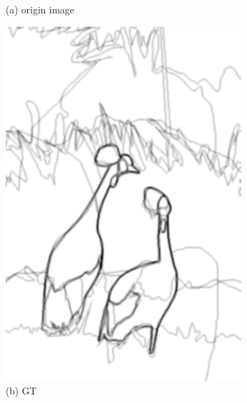 \documentclass[CJK,aspectratio=169]{beamer}  %
\begin{document}
\begin{frame}
\begin{figure}
\begin{minipage}{0.11\columnwidth}
				\caption*{\tiny (a) origin image}
				\label{fig: origin image}
			\end{minipage}
			\begin{minipage}{0.11\columnwidth}
				\includegraphics[width=\linewidth]{picture/LLIE/RCF/GT}
				\caption*{\tiny (b) GT}
				\label{fig: RCF_GT}
			\end{minipage}
			\begin{minipage}{0.11\columnwidth}

\end{minipage}
\end{figure}
\end{frame}
\end{document}
